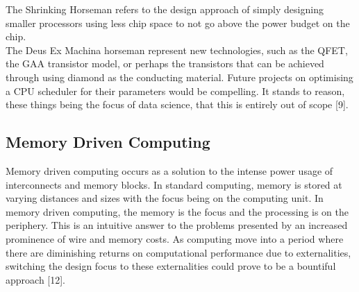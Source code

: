 			The Shrinking Horseman refers to the design approach of simply designing smaller processors using less chip space to not go above the power budget on the chip.\\
			The Deus Ex Machina horseman represent new technologies, such as the QFET, the GAA transistor model, or perhaps the transistors that can be achieved through using diamond as the conducting material. Future projects on optimising a CPU scheduler for their parameters would be compelling. It stands to reason, these things being the focus of data science, that this is entirely out of scope [9].
		
		\subsection{Memory Driven Computing}
			Memory driven computing occurs as a solution to the intense power usage of interconnects and memory blocks. In standard computing, memory is stored at varying distances and sizes with the focus being on the computing unit. In memory driven computing, the memory is the focus and the processing is on the periphery. This is an intuitive answer to the problems presented by an increased prominence of wire and memory costs. As computing move into a period where there are diminishing returns on computational performance due to externalities, switching the design focus to these externalities could prove to be a bountiful approach [12]. 
		
